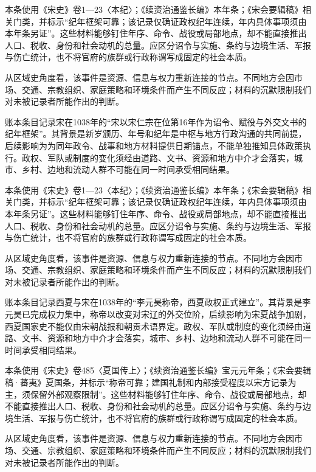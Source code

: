 本条使用《宋史》卷1—23〈本纪〉；《续资治通鉴长编》本年条；《宋会要辑稿》相关门类，并标示“纪年框架可靠；该记录仅确证政权纪年连续，年内具体事项须由本年条另证”。这些材料能够钉住年序、命令、战役或局部地点，却不能直接推出人口、税收、身份和社会动机的总量。应区分诏令与实施、条约与边境生活、军报与伤亡统计，也不将官府的族群或行政称谓写成固定的社会本质。

从区域史角度看，该事件是资源、信息与权力重新连接的节点。不同地方会因市场、交通、宗教组织、家庭策略和环境条件而产生不同反应；材料的沉默限制我们对未被记录者所能作出的判断。

账本条目记录宋在1038年的“宋以宋仁宗在位第16年作为诏令、赋役与外交文书的纪年框架”。其背景是新岁颁历、年号和纪年是中枢与地方行政沟通的共同前提，后续影响为为同年政令、战事和地方材料提供日期锚点，不能单独推知具体政策执行。政权、军队或制度的变化须经由道路、文书、资源和地方中介才会落实，城市、乡村、边地和流动人群不可能在同一时间承受相同结果。

本条使用《宋史》卷1—23〈本纪〉；《续资治通鉴长编》本年条；《宋会要辑稿》相关门类，并标示“纪年框架可靠；该记录仅确证政权纪年连续，年内具体事项须由本年条另证”。这些材料能够钉住年序、命令、战役或局部地点，却不能直接推出人口、税收、身份和社会动机的总量。应区分诏令与实施、条约与边境生活、军报与伤亡统计，也不将官府的族群或行政称谓写成固定的社会本质。

从区域史角度看，该事件是资源、信息与权力重新连接的节点。不同地方会因市场、交通、宗教组织、家庭策略和环境条件而产生不同反应；材料的沉默限制我们对未被记录者所能作出的判断。

账本条目记录西夏与宋在1038年的“李元昊称帝，西夏政权正式建立”。其背景是李元昊已完成权力集中，称帝以改变对宋辽的外交位阶，后续影响为宋夏战争加剧，西夏国家史不能仅由宋朝战报和朝贡术语界定。政权、军队或制度的变化须经由道路、文书、资源和地方中介才会落实，城市、乡村、边地和流动人群不可能在同一时间承受相同结果。

本条使用《宋史》卷485〈夏国传上〉；《续资治通鉴长编》宝元元年条；《宋会要辑稿·蕃夷》夏国条，并标示“称帝可靠；建国礼制和内部接受程度以宋方记录为主，须保留外部观察限制”。这些材料能够钉住年序、命令、战役或局部地点，却不能直接推出人口、税收、身份和社会动机的总量。应区分诏令与实施、条约与边境生活、军报与伤亡统计，也不将官府的族群或行政称谓写成固定的社会本质。

从区域史角度看，该事件是资源、信息与权力重新连接的节点。不同地方会因市场、交通、宗教组织、家庭策略和环境条件而产生不同反应；材料的沉默限制我们对未被记录者所能作出的判断。

